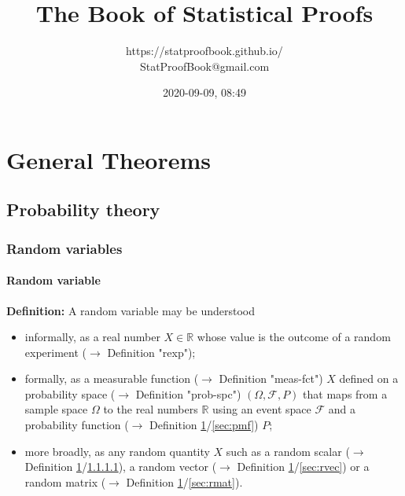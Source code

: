 \documentclass[a4paper,12pt,twoside]{book}
\title{\Huge{The Book of Statistical Proofs}}
\author{https://statproofbook.github.io/ \\ StatProofBook@gmail.com}
\date{2020-09-09, 08:49}
\begin{document}
\maketitle

\pagebreak
{}
\tableofcontents

\newpage
{}


\chapter{General Theorems} \label{sec:General Theorems} \newpage

\pagebreak
\section{Probability theory}

\subsection{Random variables}

\subsubsection[\textit{Random variable}]{Random variable} \label{sec:rvar}
\setcounter{equation}{0}

\textbf{Definition:} A random variable may be understood

\begin{itemize}

\item informally, as a real number $X \in \mathbb{R}$ whose value is the outcome of a random experiment ($\rightarrow$ Definition "rexp");

\item formally, as a measurable function ($\rightarrow$ Definition "meas-fct") $X$ defined on a probability space ($\rightarrow$ Definition "prob-spc") $(\Omega, \mathcal{F}, P)$ that maps from a sample space $\Omega$ to the real numbers $\mathbb{R}$ using an event space $\mathcal{F}$ and a probability function ($\rightarrow$ Definition \ref{sec:General Theorems}/\ref{sec:pmf}) $P$;

\item more broadly, as any random quantity $X$ such as a random scalar ($\rightarrow$ Definition \ref{sec:General Theorems}/\ref{sec:rvar}), a random vector ($\rightarrow$ Definition \ref{sec:General Theorems}/\ref{sec:rvec}) or a random matrix ($\rightarrow$ Definition \ref{sec:General Theorems}/\ref{sec:rmat}).

\end{itemize}
\end{document}
